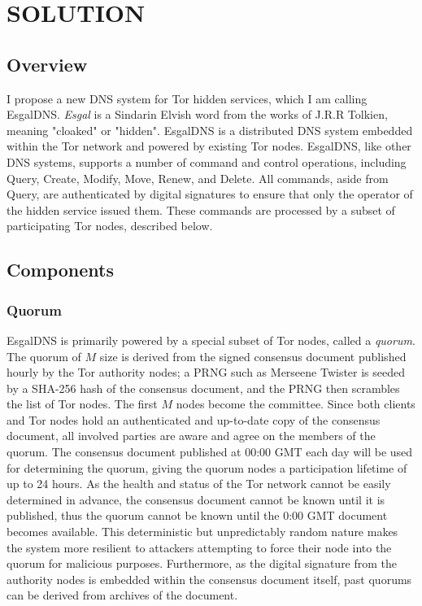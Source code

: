 

\chapter{\uppercase{Solution}}

\section{Overview}

I propose a new DNS system for Tor hidden services, which I am calling EsgalDNS. \textit{Esgal} is a Sindarin Elvish word from the works of J.R.R Tolkien, meaning "cloaked" or "hidden". EsgalDNS is a distributed DNS system embedded within the Tor network and powered by existing Tor nodes. EsgalDNS, like other DNS systems, supports a number of command and control operations, including Query, Create, Modify, Move, Renew, and Delete. All commands, aside from Query, are authenticated by digital signatures to ensure that only the operator of the hidden service issued them. These commands are processed by a subset of participating Tor nodes, described below.

\section{Components}

\subsection{Quorum}

EsgalDNS is primarily powered by a special subset of Tor nodes, called a \textit{quorum}. The quorum of $ M $ size is derived from the signed consensus document published hourly by the Tor authority nodes; a PRNG such as Merseene Twister is seeded by a SHA-256 hash of the consensus document, and the PRNG then scrambles the list of Tor nodes. The first $ M $ nodes become the committee. Since both clients and Tor nodes hold an authenticated and up-to-date copy of the consensus document, all involved parties are aware and agree on the members of the quorum. The consensus document published at 00:00 GMT each day will be used for determining the quorum, giving the quorum nodes a participation lifetime of up to 24 hours. As the health and status of the Tor network cannot be easily determined in advance, the consensus document cannot be known until it is published, thus the quorum cannot be known until the 0:00 GMT document becomes available. This deterministic but unpredictably random nature makes the system more resilient to attackers attempting to force their node into the quorum for malicious purposes. Furthermore, as the digital signature from the authority nodes is embedded within the consensus document itself, past quorums can be derived from archives of the document.

